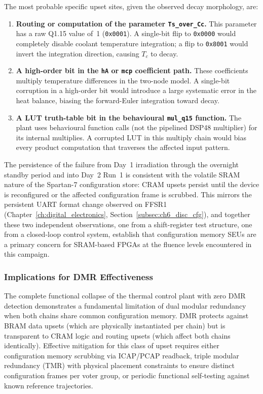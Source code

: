 The most probable specific upset sites, given the observed decay
morphology, are:

\begin{enumerate}
\item \textbf{Routing or computation of the parameter
      \texttt{Ts\_over\_Cc}.}  This parameter has a raw Q1.15 value of~1
      (\texttt{0x0001}).  A single-bit flip to \texttt{0x0000} would
      completely disable coolant temperature integration; a flip to
      \texttt{0x8001} would invert the integration direction, causing
      $T_c$ to decay.

\item \textbf{A high-order bit in the \texttt{hA} or \texttt{mcp}
      coefficient path.}  These coefficients multiply temperature
      differences in the two-node model.  A single-bit corruption in a
      high-order bit would introduce a large systematic error in the heat
      balance, biasing the forward-Euler integration toward decay.

\item \textbf{A LUT truth-table bit in the behavioural
      \texttt{mul\_q15} function.}  The plant uses behavioural function
      calls (not the pipelined DSP48 multiplier) for its internal
      multiplies.  A corrupted LUT in this multiply chain would bias
      every product computation that traverses the affected input pattern.
\end{enumerate}

The persistence of the failure from Day~1 irradiation through the
overnight standby period and into Day~2 Run~1 is consistent with the
volatile SRAM nature of the Spartan-7 configuration store: CRAM upsets
persist until the device is reconfigured or the affected configuration
frame is scrubbed.  This mirrors the persistent UART format change
observed on FFSR1 (Chapter~\ref{ch:digital_electronics},
Section~\ref{subsec:ch6_disc_cfg}), and together these two independent
observations, one from a shift-register test structure, one from a
closed-loop control system, establish that configuration memory SEUs are
a primary concern for SRAM-based FPGAs at the fluence levels encountered
in this campaign.

\subsubsection{Implications for DMR Effectiveness}

The complete functional collapse of the thermal control plant with zero
DMR detection demonstrates a fundamental limitation of dual modular
redundancy when both chains share common configuration memory.  DMR
protects against BRAM data upsets (which are physically instantiated per
chain) but is transparent to CRAM logic and routing upsets (which affect
both chains identically).  Effective mitigation for this class of upset
requires either configuration memory scrubbing via ICAP/PCAP readback,
triple modular redundancy (TMR) with physical placement constraints to
ensure distinct configuration frames per voter group, or periodic
functional self-testing against known reference trajectories.

